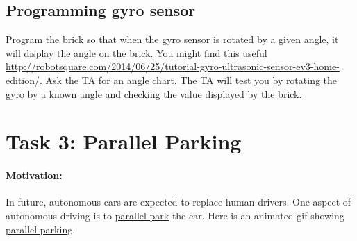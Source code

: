 \documentclass[11pt]{article}
\def\bluehref#1#2{\href{#1}{\color{blue} #2}}
\begin{document}
\subsection*{Programming gyro sensor} Program the brick so that when the gyro sensor is rotated by a given angle, it will display the angle on the brick. You might find this useful \\ \bluehref{http://robotsquare.com/2014/06/25/tutorial-gyro-ultrasonic-sensor-ev3-home-edition/}{http://robotsquare.com/2014/06/25/tutorial-gyro-ultrasonic-sensor-ev3-home-edition/}. Ask the TA for an angle chart. The TA will test you by rotating the gyro by a known angle and checking the value displayed by the brick. 





\section*{Task 3: Parallel Parking} 
\paragraph{Motivation:} In future, autonomous cars are expected to replace human drivers. One aspect of autonomous driving is to \bluehref{https://en.wikipedia.org/wiki/Parallel_parking}{parallel park} the car. %
Here is an animated gif showing \bluehref{https://en.wikipedia.org/wiki/File:ParallelParkingAnimation.gif}{parallel parking}.  
\end{document}
